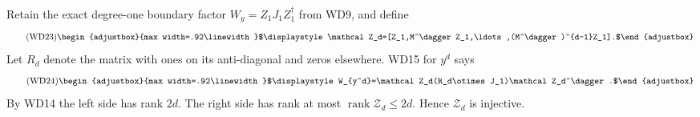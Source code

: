 \documentclass[11pt]{article}
\begin{document}
Retain the exact degree-one boundary factor \(W_y=Z_1J_1Z_1^\dagger\) from WD9, and define 
\begin{equation*}
\tag{WD23}
\begin{adjustbox}{max width=.92\linewidth}$\displaystyle \mathcal Z_d=[Z_1,M^\dagger Z_1,\ldots,(M^\dagger)^{d-1}Z_1].$\end{adjustbox}
\end{equation*}
 Let \(R_d\) denote the matrix with ones on its anti-diagonal and zeros elsewhere. WD15 for \(y^d\) says 
\begin{equation*}
\tag{WD24}
\begin{adjustbox}{max width=.92\linewidth}$\displaystyle W_{y^d}=\mathcal Z_d(R_d\otimes J_1)\mathcal Z_d^\dagger.$\end{adjustbox}
\end{equation*}
 By WD14 the left side has rank \(2d\). The right side has rank at most \(\operatorname{rank}\mathcal Z_d\le2d\). Hence \(\mathcal Z_d\) is injective.
\end{document}
